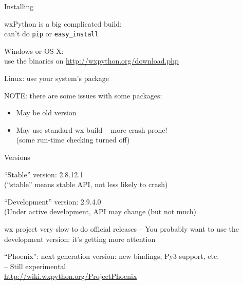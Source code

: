 \documentclass{beamer}
\begin{document}
\begin{frame}[fragile]{Installing}

{\Large wxPython is a big complicated build:\\
        can't do \verb`pip` or \verb`easy_install`}

\vfill
{\Large Windows or OS-X:\\
use the binaries on \url{http://wxpython.org/download.php}}

\vfill
{\Large Linux: use your system's package}

{\large NOTE: there are some issues with some packages:}
\begin{itemize}
    \item May be old version
    \item May use standard wx build -- more crash prone!\\ 
          (some run-time checking turned off)
\end{itemize}


\end{frame}

\begin{frame}[fragile]{Versions}

\vfill
{\Large ``Stable'' version: 2.8.12.1}\\
{\large (``stable'' means stable API, not less likely to crash)}

\vfill
{\Large ``Development'' version: 2.9.4.0}\\
{\large (Under active development, API may change (but not much)}

\vfill
{\Large wx project very slow to do official releases -- You probably want to use the development version: it's getting more attention}

\vfill
{\Large ``Phoenix'': next generation version: new bindings, Py3 support, etc.}\\
{\large -- Still experimental}\\
\url{http://wiki.wxpython.org/ProjectPhoenix}

\end{frame}
\end{document}
